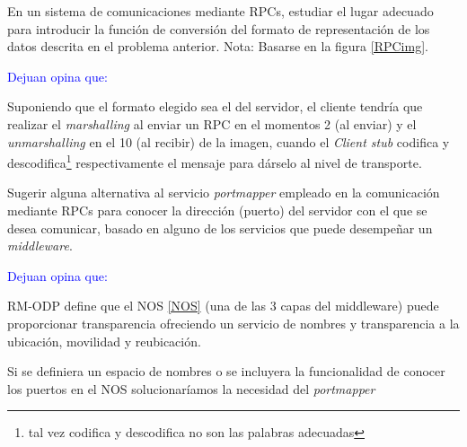   \begin{problem}[3]
  En un sistema de comunicaciones mediante RPCs, estudiar el lugar adecuado
para introducir la función de conversión del formato de representación de los
datos descrita en el problema anterior. Nota: Basarse en la figura \ref{RPCimg}.
  \solution

\textcolor{blue}{Dejuan opina que:}

Suponiendo que el formato elegido sea el del servidor, el cliente tendría que realizar el \textit{marshalling} al enviar un RPC en el momentos 2 (al enviar) y el \textit{unmarshalling} en el 10 (al recibir) de la imagen, cuando el \textit{Client stub} codifica y descodifica\footnote{tal vez codifica y descodifica no son las palabras adecuadas} respectivamente el mensaje para dárselo al nivel de transporte.

  \end{problem}

  \begin{problem}[4]
  Sugerir alguna alternativa al servicio \textit{portmapper} empleado en la
comunicación mediante RPCs para conocer la dirección (puerto) del servidor
con el que se desea comunicar, basado en alguno de los servicios que puede
desempeñar un \textit{middleware}.
  \solution

\textcolor{blue}{Dejuan opina que:}


RM-ODP define que el NOS \ref{NOS} (una de las 3 capas del middleware) puede proporcionar transparencia ofreciendo un servicio de nombres y transparencia a la ubicación, movilidad y reubicación.

Si se definiera un espacio de nombres o se incluyera la funcionalidad de conocer los puertos en el NOS solucionaríamos la necesidad del \textit{portmapper}

  \end{problem}

